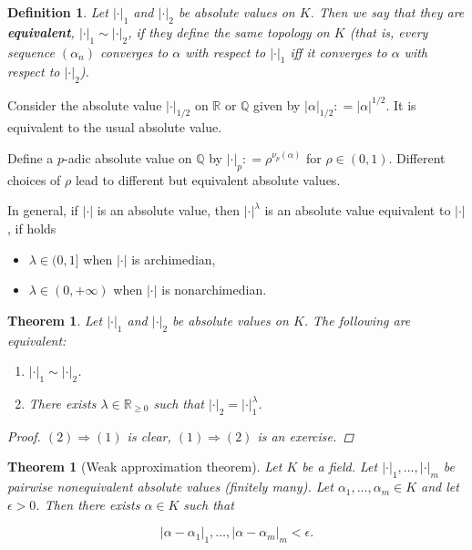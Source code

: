 \documentclass{article}
\newcommand{\term}{\textbf}
\newcommand{\dfn}{\mathrel{\mathop:}=}
\newcommand{\QQ}{\mathbb{Q}}
\newcommand{\examplesymbol}{$\blacktriangle$}
\renewcommand{\qedsymbol}{$\blacksquare$}
\theoremstyle{myplain}
\newtheorem{theorem}[proposition]{Theorem}
\theoremstyle{mydefinition}
\newtheorem{definition}[proposition]{Definition}
\newenvironment{example}
  {\pushQED{\qed}\renewcommand{\qedsymbol}{\examplesymbol}\examplex}
  {\popQED\endexamplex}
\begin{document}
\begin{definition}
  Let $|\cdot|_1$ and $|\cdot|_2$ be absolute values on $K$. Then we say that
  they are \term{equivalent}, $|\cdot|_1 \sim |\cdot|_2$, if they define the
  same topology on $K$ (that is, every sequence $(\alpha_n)$ converges to
  $\alpha$ with respect to $|\cdot|_1$ iff it converges to $\alpha$ with respect
  to $|\cdot|_2$).
\end{definition}

\begin{example}
  Consider the absolute value $|\cdot|_{1/2}$ on $\mathbb{R}$ or $\QQ$ given by
  $|\alpha|_{1/2} \dfn |\alpha|^{1/2}$. It is equivalent to the usual absolute
  value.

  Define a $p$-adic absolute value on $\QQ$ by
  $|\cdot|_p \dfn \rho^{ \nu_p (\alpha)}$ for $\rho \in (0,1)$. Different
  choices of $\rho$ lead to different but equivalent absolute values.
\end{example}

In general, if $|\cdot|$ is an absolute value, then $|\cdot|^\lambda$ is an
absolute value equivalent to $|\cdot|$, if holds

\begin{itemize}
\item $\lambda \in (0,1]$ when $|\cdot|$ is archimedian,

\item $\lambda \in (0,+\infty)$ when $|\cdot|$ is nonarchimedian.
\end{itemize}

\begin{theorem}
  Let $|\cdot|_1$ and $|\cdot|_2$ be absolute values on $K$. The following are
  equivalent:
  \begin{enumerate}
  \item $|\cdot|_1 \sim |\cdot|_2$.

  \item There exists $\lambda \in \mathbb{R}_{\ge 0}$ such that
    $|\cdot|_2 = |\cdot|_1^\lambda$.
  \end{enumerate}

  \begin{proof}
    $(2) \Rightarrow (1)$ is clear, $(1) \Rightarrow (2)$ is an exercise.
  \end{proof}
\end{theorem}

\begin{theorem}[Weak approximation theorem]
  Let $K$ be a field. Let $|\cdot|_1, \ldots, |\cdot|_m$ be pairwise
  nonequivalent absolute values (finitely many). Let
  $\alpha_1,\ldots,\alpha_m \in K$ and let $\epsilon > 0$. Then there exists
  $\alpha \in K$ such that

  \[ |\alpha-\alpha_1|_1, \ldots, |\alpha-\alpha_m|_m < \epsilon. \]
\end{theorem}
\end{document}
